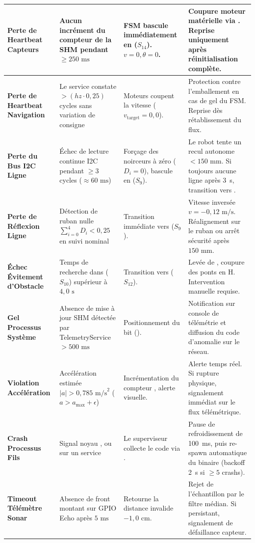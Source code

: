 \begin{small}
\begin{xltabular}{\textwidth}{lp{3.5cm}p{3.5cm}X}
\textbf{Perte de Heartbeat Capteurs} & Aucun incrément du compteur  de la SHM pendant $\ge 250\text{ ms}$ & FSM bascule immédiatement en  ($S_{14}$). $v = 0, \theta = 0$. & Coupure moteur matérielle via . Reprise uniquement après réinitialisation complète. \\
\midrule
\textbf{Perte de Heartbeat Navigation} & Le service  constate $> (hz \cdot 0{,}25)$ cycles sans variation de consigne & Moteurs coupent la vitesse ($v_{\text{target}} = 0{,}0$). & Protection contre l'emballement en cas de gel du FSM. Reprise dès rétablissement du flux. \\
\midrule
\textbf{Perte du Bus I2C Ligne} & Échec de lecture continue I2C pendant $\ge 3$ cycles ($\approx 60\text{ ms}$) & Forçage des noirceurs à zéro ($D_i = 0$), bascule en  ($S_9$). & Le robot tente un recul autonome $< 150\text{ mm}$. Si toujours aucune ligne après 3~s, transition vers . \\
\midrule
\textbf{Perte de Réflexion Ligne} & Détection de ruban nulle $\sum_{i=0}^4 D_i < 0{,}25$ en suivi nominal & Transition immédiate vers  ($S_9$). & Vitesse inversée $v = -0{,}12\text{ m/s}$. Réalignement sur le ruban ou arrêt sécurité après $150\text{ mm}$. \\
\midrule
\textbf{Échec Évitement d'Obstacle} & Temps de recherche dans  ($S_{10}$) supérieur à $4{,}0\text{ s}$ & Transition vers  ($S_{12}$). & Levée de , coupure des ponts en H. Intervention manuelle requise. \\
\midrule
\textbf{Gel Processus Système} & Absence de mise à jour SHM détectée par TelemetryService $> 500\text{ ms}$ & Positionnement du bit  (). & Notification sur console de télémétrie et diffusion du code d'anomalie sur le réseau. \\
\midrule
\textbf{Violation Accélération} & Accélération estimée $|a| > 0{,}785\text{ m/s}^2$ ($a > a_{\max} + \epsilon$) & Incrémentation du compteur , alerte visuelle. & Alerte temps réel. Si rupture physique, signalement immédiat sur le flux télémétrique. \\
\midrule
\textbf{Crash Processus Fils} & Signal noyau ,  ou  sur un service & Le superviseur  collecte le code via . & Pause de refroidissement de 100~ms, puis re-spawn automatique du binaire (backoff 2~s si $\ge 5$ crashs). \\
\midrule
\textbf{Timeout Télémètre Sonar} & Absence de front montant sur GPIO Echo après $5\text{ ms}$ & Retourne la distance invalide $-1{,}0\text{ cm}$. & Rejet de l'échantillon par le filtre médian. Si persistant, signalement de défaillance capteur. \\
\end{xltabular}
\end{small}
